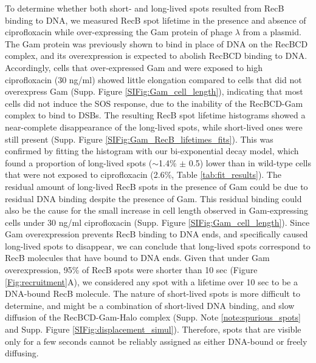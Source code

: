 To determine whether both short- and long-lived spots resulted from RecB binding to DNA, we measured RecB spot lifetime in the presence and absence of ciprofloxacin while over-expressing the Gam protein of phage $\lambda$ from a plasmid. The Gam protein was previously shown to bind in place of DNA on the RecBCD complex\cite{Wilkinson2016}, and its overexpression is expected to abolish RecBCD binding to DNA. Accordingly, cells that over-expressed Gam and were exposed to high ciprofloxacin (30 ng/ml) showed little elongation compared to cells that did not overexpress Gam (Supp. Figure \ref{SIFig:Gam_cell_length}), indicating that most cells did not induce the SOS response, due to the inability of the RecBCD-Gam complex to bind to DSBs. The resulting RecB spot lifetime histograms showed a near-complete disappearance of the long-lived spots, while short-lived ones were still present (Supp. Figure \ref{SIFig:Gam_RecB_lifetimes_fits}). This was confirmed by fitting the histogram with our bi-exponential decay model, which found a proportion of long-lived spots ($\sim$1.4\% $\pm$ 0.5) lower than in wild-type cells that were not exposed to ciprofloxacin (2.6\%, Table \ref{tab:fit_results}). The residual amount of long-lived RecB spots in the presence of Gam could be due to residual DNA binding despite the presence of Gam. This residual binding could also be the cause for the small increase in cell length observed in Gam-expressing cells under 30 ng/ml ciprofloxacin (Supp. Figure \ref{SIFig:Gam_cell_length}). Since Gam overexpression prevents RecB binding to DNA ends, and specifically caused long-lived spots to disappear, we can conclude that long-lived spots correspond to RecB molecules that have bound to DNA ends. Given that under Gam overexpression, 95\% of RecB spots were shorter than 10 sec (Figure \ref{Fig:recruitment}A), we considered any spot with a lifetime over 10 sec to be a DNA-bound RecB molecule. The nature of short-lived spots is more difficult to determine, and might be a combination of short-lived DNA binding, and slow diffusion of the RecBCD-Gam-Halo complex (Supp. Note \ref{note:spurious_spots} and Supp. Figure \ref{SIFig:displacement_simul}). Therefore, spots that are visible only for a few seconds cannot be reliably assigned as either DNA-bound or freely diffusing.

